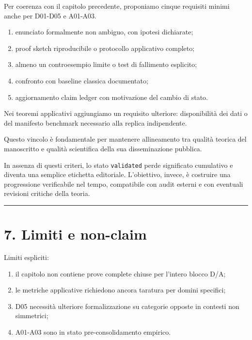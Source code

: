 Per coerenza con il capitolo precedente, proponiamo cinque requisiti minimi anche per D01-D05 e A01-A03.

\begin{enumerate}
\def\labelenumi{\arabic{enumi}.}
\tightlist
\item
  enunciato formalmente non ambiguo, con ipotesi dichiarate;
\item
  proof sketch riproducibile o protocollo applicativo completo;
\item
  almeno un controesempio limite o test di fallimento esplicito;
\item
  confronto con baseline classica documentato;
\item
  aggiornamento claim ledger con motivazione del cambio di stato.
\end{enumerate}

Nei teoremi applicativi aggiungiamo un requisito ulteriore: disponibilità dei dati o del manifesto benchmark necessario alla replica indipendente.

Questo vincolo è fondamentale per mantenere allineamento tra qualità teorica del manoscritto e qualità scientifica della sua disseminazione pubblica.

In assenza di questi criteri, lo stato \texttt{validated} perde significato cumulativo e diventa una semplice etichetta editoriale. L'obiettivo, invece, è costruire una progressione verificabile nel tempo, compatibile con audit esterni e con eventuali revisioni critiche della teoria.

\begin{center}\rule{0.5\linewidth}{0.5pt}\end{center}

\section{7. Limiti e non-claim}

Limiti espliciti:

\begin{enumerate}
\def\labelenumi{\arabic{enumi}.}
\tightlist
\item
  il capitolo non contiene prove complete chiuse per l'intero blocco D/A;
\item
  le metriche applicative richiedono ancora taratura per domini specifici;
\item
  D05 necessità ulteriore formalizzazione su categorie opposte in contesti non simmetrici;
\item
  A01-A03 sono in stato pre-consolidamento empirico.
\end{enumerate}

